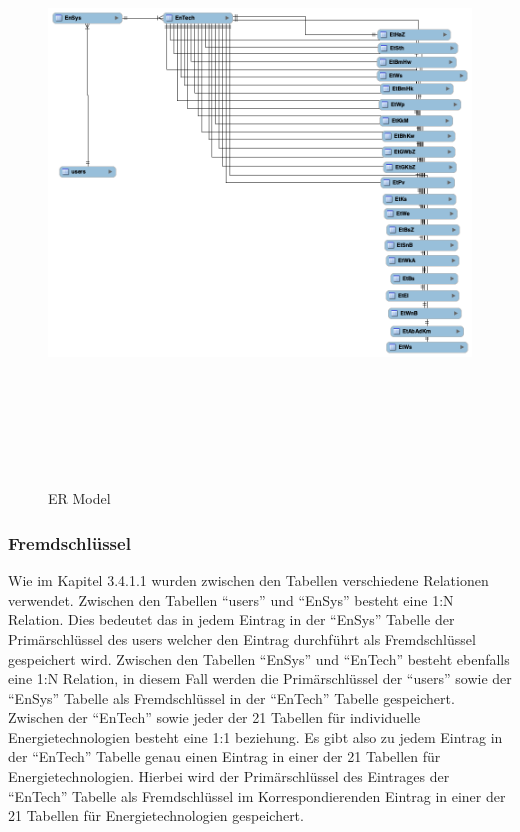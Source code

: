 \begin{figure}[h]
	\centering
	\includegraphics[height=16cm,width=18cm]{images/eer}
	\caption{ER Model}
	\label{fig:ERModel}
\end{figure}
\newpage
\subsubsection{Fremdschlüssel}
Wie im Kapitel 3.4.1.1 wurden zwischen den Tabellen verschiedene Relationen verwendet. Zwischen den Tabellen “users” und “EnSys” besteht eine 1:N Relation. Dies bedeutet das in jedem Eintrag in der “EnSys” Tabelle der Primärschlüssel des users welcher den Eintrag durchführt als Fremdschlüssel gespeichert wird. Zwischen den Tabellen “EnSys” und “EnTech” besteht ebenfalls eine 1:N Relation, in diesem Fall werden die Primärschlüssel der “users” sowie der “EnSys” Tabelle als Fremdschlüssel in der “EnTech” Tabelle gespeichert. Zwischen der “EnTech” sowie jeder der 21 Tabellen für individuelle Energietechnologien besteht eine 1:1 beziehung. Es gibt also zu jedem Eintrag in der “EnTech” Tabelle genau einen Eintrag in einer der 21 Tabellen für Energietechnologien. Hierbei wird der Primärschlüssel des Eintrages der “EnTech” Tabelle als Fremdschlüssel im Korrespondierenden Eintrag in einer der 21 Tabellen für Energietechnologien gespeichert.



